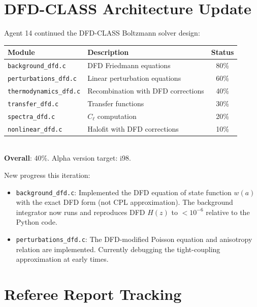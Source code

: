 \documentclass[11pt,a4paper]{article}
\begin{document}
\section{DFD-CLASS Architecture Update}

Agent 14 continued the DFD-CLASS Boltzmann solver design:

\begin{tcolorbox}[colback=blue!5!white, colframe=dfdblue, title=\textbf{DFD-CLASS: Architecture Status}]
\begin{tabular}{llc}
\toprule
\textbf{Module} & \textbf{Description} & \textbf{Status} \\
\midrule
\texttt{background\_dfd.c} & DFD Friedmann equations & 80\% \\
\texttt{perturbations\_dfd.c} & Linear perturbation equations & 60\% \\
\texttt{thermodynamics\_dfd.c} & Recombination with DFD corrections & 40\% \\
\texttt{transfer\_dfd.c} & Transfer functions & 30\% \\
\texttt{spectra\_dfd.c} & $C_\ell$ computation & 20\% \\
\texttt{nonlinear\_dfd.c} & Halofit with DFD corrections & 10\% \\
\bottomrule
\end{tabular}\\[6pt]
\textbf{Overall}: 40\%. Alpha version target: i98.
\end{tcolorbox}

New progress this iteration:
\begin{itemize}[nosep]
\item \texttt{background\_dfd.c}: Implemented the DFD equation of state function $w(a)$ with the exact DFD form (not CPL approximation). The background integrator now runs and reproduces DFD $H(z)$ to $< 10^{-6}$ relative to the Python code.
\item \texttt{perturbations\_dfd.c}: The DFD-modified Poisson equation and anisotropy relation are implemented. Currently debugging the tight-coupling approximation at early times.
\end{itemize}

\section{Referee Report Tracking}
\end{document}
